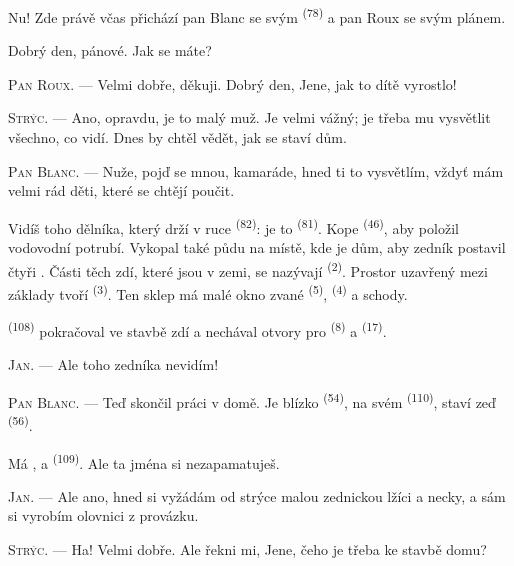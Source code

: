 Nu! Zde právě včas přichází pan Blanc se svým  \textsuperscript{(78)} a pan
Roux se svým plánem.

Dobrý den, pánové. Jak se máte?

\textsc{Pan Roux}. --- Velmi dobře, děkuji. Dobrý den, Jene, jak to dítě vyrostlo!

\textsc{Strýc}. --- Ano, opravdu, je to malý muž. Je velmi vážný; je třeba mu vysvětlit
všechno, co vidí. Dnes by chtěl vědět, jak se staví dům.

\VUsaut{3.0mm}

\textsc{Pan Blanc}. --- Nuže, pojď se mnou, kamaráde, hned ti to vysvětlím, vždyť mám velmi
rád děti, které se chtějí poučit.

Vidíš toho dělníka, který drží v ruce  \textsuperscript{(82)}: je to
 \textsuperscript{(81)}. Kope 
\textsuperscript{(46)}, aby položil vodovodní potrubí. Vykopal také půdu na místě, kde je dům,
aby zedník postavil čtyři . Části těch zdí, které jsou v zemi, se nazývají
 \textsuperscript{(2)}. Prostor uzavřený mezi základy tvoří
 \textsuperscript{(3)}. Ten sklep má malé okno zvané  \textsuperscript{(5)},  \textsuperscript{(4)} a schody.

 \textsuperscript{(108)} pokračoval ve stavbě zdí a nechával otvory pro
 \textsuperscript{(8)} a  \textsuperscript{(17)}.

\textsc{Jan}. --- Ale toho zedníka nevidím!

\textsc{Pan Blanc}. --- Teď skončil práci v domě. Je blízko 
\textsuperscript{(54)}, na svém  \textsuperscript{(110)}, staví zeď
 \textsuperscript{(56)}.

Má ,  a  \textsuperscript{(109)}. Ale
ta jména si nezapamatuješ.

\textsc{Jan}. --- Ale ano, hned si vyžádám od strýce malou zednickou lžíci a necky, a sám si
vyrobím olovnici z provázku.

\VUsaut{3.0mm}
\VUsaut{3.0mm}

\textsc{Strýc}. --- Ha! Velmi dobře. Ale řekni mi, Jene, čeho je třeba ke stavbě domu?

